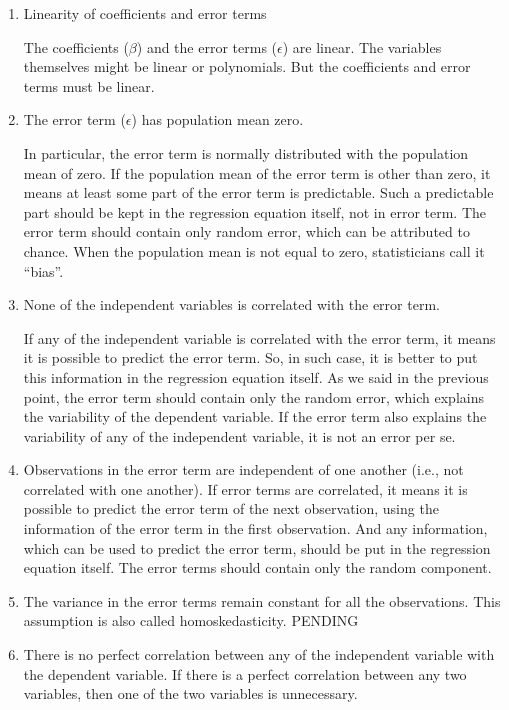 \documentclass[
  letterpaper,
  paper =a4,
  twoside,
  openright,
  headsepline,
  footsepline,
  listof = totocnumbered,
  chapterprefix = true,
  firstiscover,
  parskip = full*]{scrbook}
\begin{document}
\begin{enumerate}
\def\labelenumi{\arabic{enumi}.}
\item
  Linearity of coefficients and error terms

  The coefficients (\(\beta\)) and the error terms (\(\epsilon\)) are
  linear. The variables themselves might be linear or polynomials. But
  the coefficients and error terms must be linear.
\item
  The error term (\(\epsilon\)) has population mean zero.

  In particular, the error term is normally distributed with the
  population mean of zero. If the population mean of the error term is
  other than zero, it means at least some part of the error term is
  predictable. Such a predictable part should be kept in the regression
  equation itself, not in error term. The error term should contain only
  random error, which can be attributed to chance. When the population
  mean is not equal to zero, statisticians call it ``bias''.
\item
  None of the independent variables is correlated with the error term.

  If any of the independent variable is correlated with the error term,
  it means it is possible to predict the error term. So, in such case,
  it is better to put this information in the regression equation
  itself. As we said in the previous point, the error term should
  contain only the random error, which explains the variability of the
  dependent variable. If the error term also explains the variability of
  any of the independent variable, it is not an error per se.
\item
  Observations in the error term are independent of one another (i.e.,
  not correlated with one another). If error terms are correlated, it
  means it is possible to predict the error term of the next
  observation, using the information of the error term in the first
  observation. And any information, which can be used to predict the
  error term, should be put in the regression equation itself. The error
  terms should contain only the random component.
\item
  The variance in the error terms remain constant for all the
  observations. This assumption is also called homoskedasticity. PENDING
\item
  There is no perfect correlation between any of the independent
  variable with the dependent variable. If there is a perfect
  correlation between any two variables, then one of the two variables
  is unnecessary.
\end{enumerate}
\end{document}

